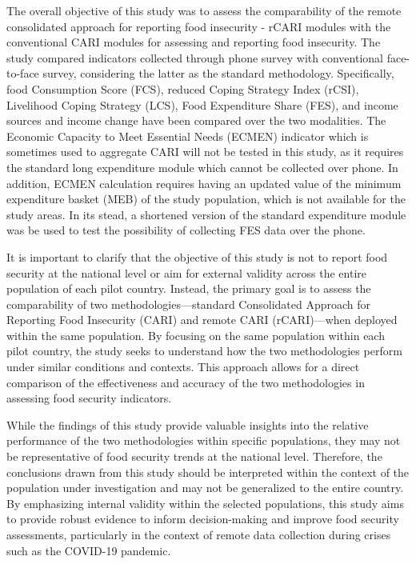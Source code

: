 \documentclass[11pt,harvard]{article}
\begin{document}
	The overall objective of this study was to assess the comparability of the remote consolidated approach for reporting food insecurity - rCARI modules with the conventional CARI modules for assessing and reporting food insecurity. The study compared indicators collected through phone survey with conventional face-to-face survey, considering the latter as the standard methodology. Specifically, food Consumption Score (FCS), reduced Coping Strategy Index (rCSI), Livelihood Coping Strategy (LCS), Food Expenditure Share (FES), and income sources and income change have been compared over the two modalities. The Economic Capacity to Meet Essential Needs (ECMEN) indicator which is sometimes used to aggregate CARI will not be tested in this study, as it requires the standard long expenditure module which cannot be collected over phone. In addition, ECMEN calculation requires having an updated value of the minimum expenditure basket (MEB) of the study population, which is not available for the study areas. In its stead, a shortened version of the standard expenditure module was be used to test the possibility of collecting FES data over the phone.
	
	It is important to clarify that the objective of this study is not to report food security at the national level or aim for external validity across the entire population of each pilot country. Instead, the primary goal is to assess the comparability of two methodologies—standard Consolidated Approach for Reporting Food Insecurity (CARI) and remote CARI (rCARI)—when deployed within the same population. By focusing on the same population within each pilot country, the study seeks to understand how the two methodologies perform under similar conditions and contexts. This approach allows for a direct comparison of the effectiveness and accuracy of the two methodologies in assessing food security indicators.
	
	While the findings of this study provide valuable insights into the relative performance of the two methodologies within specific populations, they may not be representative of food security trends at the national level. Therefore, the conclusions drawn from this study should be interpreted within the context of the population under investigation and may not be generalized to the entire country. By emphasizing internal validity within the selected populations, this study aims to provide robust evidence to inform decision-making and improve food security assessments, particularly in the context of remote data collection during crises such as the COVID-19 pandemic.
	
\end{document}
